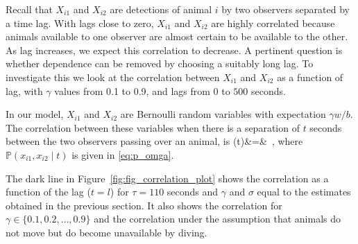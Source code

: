 \documentclass[useAMS, usenatbib, referee]{biom}\usepackage[]{graphicx}\usepackage[]{color}
\begin{document}
Recall that $X_{i1}$ and $X_{i2}$ are detections of animal $i$ by two observers separated by a time lag. With lags close to zero, $X_{i1}$ and $X_{i2}$ are highly correlated because animals available to one observer are almost certain to be available to the other. As lag increases, we expect this correlation to decrease. A pertinent question is whether dependence can be removed by choosing a suitably long lag. To investigate this we look at the correlation between $X_{i1}$ and $X_{i2}$ as a function of lag, with $\gamma$ values from 0.1 to 0.9, and lags from 0 to $500$ seconds.

In our model, $X_{i1}$ and $X_{i2}$ are Bernoulli random variables with expectation $\gamma w/b$. The correlation between these variables when there is a separation of $t$ seconds between the two observers passing over an animal, is
\be
\rho(t)&=&
\,,
\ee
\noindent
where $\mathbb{P}(x_{i1}, x_{i2} \mid t)$ is given in \eqref{eq:p_omga}.



The dark line in Figure~\ref{fig:fig_correlation_plot} shows the correlation as a function of the lag ($t=l$) for $\tau=110$ seconds and $\gamma$ and $\sigma$ equal to the estimates obtained in the previous section. It also shows the correlation for $\gamma\in\{0.1, 0.2,\ldots,0.9\}$ and the correlation under the assumption that animals do not move but do become unavailable by diving.
\end{document}
